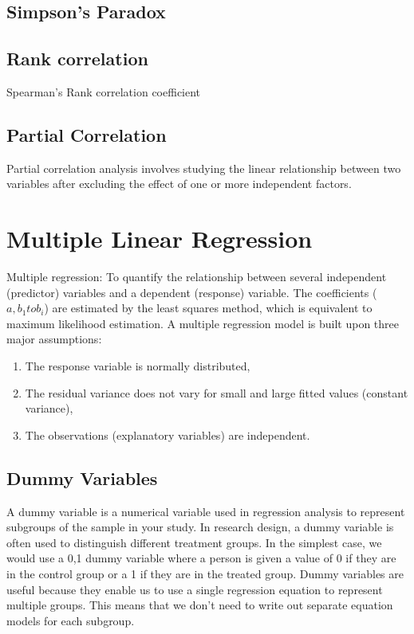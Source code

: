 \documentclass[a4paper,12pt]{article}
\begin{document}
\subsection{Simpson's Paradox}
\subsection{Rank correlation}
Spearman's Rank correlation coefficient


\subsection{Partial Correlation}
Partial correlation analysis involves studying the linear relationship between two variables after excluding the effect of one or more independent factors.

\section{Multiple Linear Regression}
Multiple regression: To quantify the relationship between several independent (predictor) variables and a dependent (response) variable. The coefficients ($a, b_{1} to b_{i}$) are estimated by the least squares method, which is equivalent to maximum likelihood estimation. A multiple regression model is built upon three major assumptions:

\begin{enumerate}
\item The response variable is normally distributed,
\item The residual variance does not vary for small and large fitted values (constant variance),
\item The observations (explanatory variables) are independent.
\end{enumerate}


\subsection{Dummy Variables}
A dummy variable is a numerical variable used in regression analysis to represent subgroups of the sample in your study. In research design, a dummy variable is often used to distinguish different treatment groups. In the simplest case, we would use a 0,1 dummy variable where a person is given a value of 0 if they are in the control group or a 1 if they are in the treated group. Dummy variables are useful because they enable us to use a single regression equation to represent multiple groups. This means that we don't need to write out separate equation models for each subgroup.
\end{document}
